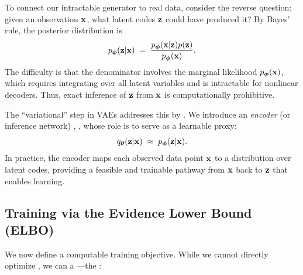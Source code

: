 To connect our intractable generator to real data, consider the reverse question:  
given an observation ${\mathbf{x}}$, what latent codes ${\mathbf{z}}$ could have produced it?  
By Bayes’ rule, the posterior distribution is
\[
p_{\bm{\phi}}({\mathbf{z}}|{\mathbf{x}}) \;=\; \frac{p_{\bm{\phi}}({\mathbf{x}}|{\mathbf{z}}) p({\mathbf{z}})}{p_{\bm{\phi}}({\mathbf{x}})}.
\]
The difficulty is that the denominator involves the marginal likelihood $p_{\bm{\phi}}({\mathbf{x}})$,  
which requires integrating over all latent variables and is intractable for nonlinear decoders.  
Thus, exact inference of ${\mathbf{z}}$ from ${\mathbf{x}}$ is computationally prohibitive.

The ``variational'' step in VAEs addresses this by .  
We introduce an \emph{encoder} (or inference network) , ,  
whose role is to serve as a learnable proxy:
\[
q_{\bm{\theta}}({\mathbf{z}}|{\mathbf{x}}) \;\approx\; p_{\bm{\phi}}({\mathbf{z}}|{\mathbf{x}}).
\]
In practice, the encoder maps each observed data point ${\mathbf{x}}$ to a distribution over latent codes,  
providing a feasible and trainable pathway from ${\mathbf{x}}$ back to ${\mathbf{z}}$ that enables learning.




\subsection{Training via the Evidence Lower Bound (ELBO)}

We now define a computable training objective. While we cannot directly optimize , we can  a —the :

